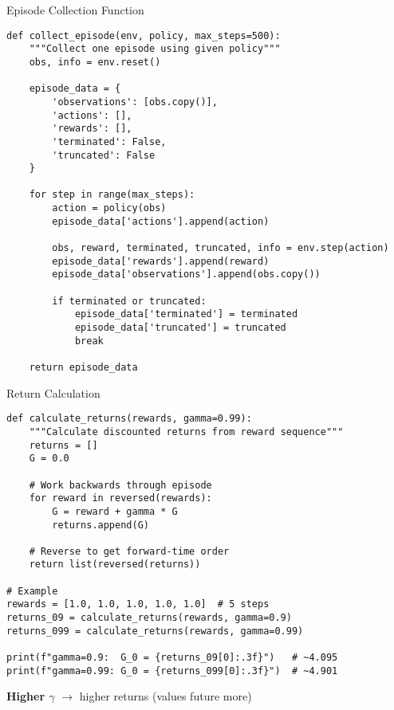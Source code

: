 \documentclass[aspectratio=169,10pt]{beamer}
\begin{document}
\begin{frame}[fragile,shrink=5]{Episode Collection Function}

\begin{lstlisting}
def collect_episode(env, policy, max_steps=500):
    """Collect one episode using given policy"""
    obs, info = env.reset()
    
    episode_data = {
        'observations': [obs.copy()],
        'actions': [],
        'rewards': [],
        'terminated': False,
        'truncated': False
    }
    
    for step in range(max_steps):
        action = policy(obs)
        episode_data['actions'].append(action)
        
        obs, reward, terminated, truncated, info = env.step(action)
        episode_data['rewards'].append(reward)
        episode_data['observations'].append(obs.copy())
        
        if terminated or truncated:
            episode_data['terminated'] = terminated
            episode_data['truncated'] = truncated
            break
    
    return episode_data
\end{lstlisting}

\end{frame}

\begin{frame}[fragile]{Return Calculation}

\begin{lstlisting}
def calculate_returns(rewards, gamma=0.99):
    """Calculate discounted returns from reward sequence"""
    returns = []
    G = 0.0
    
    # Work backwards through episode
    for reward in reversed(rewards):
        G = reward + gamma * G
        returns.append(G)
    
    # Reverse to get forward-time order
    return list(reversed(returns))

# Example
rewards = [1.0, 1.0, 1.0, 1.0, 1.0]  # 5 steps
returns_09 = calculate_returns(rewards, gamma=0.9)
returns_099 = calculate_returns(rewards, gamma=0.99)

print(f"gamma=0.9:  G_0 = {returns_09[0]:.3f}")   # ~4.095
print(f"gamma=0.99: G_0 = {returns_099[0]:.3f}")  # ~4.901
\end{lstlisting}

\textbf{Higher $\gamma$} $\rightarrow$ higher returns (values future more)

\end{frame}
\end{document}
